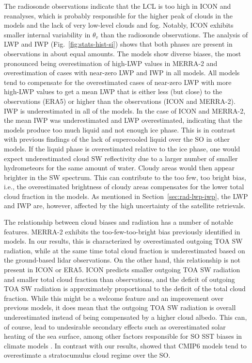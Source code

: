 \documentclass[draft]{agujournal2019}
\begin{document}
The radiosonde observations indicate that the LCL is too high in ICON and reanalyses, which is probably responsible for the higher peak of clouds in the models and the lack of very low-level clouds and fog. Notably, ICON exhibits smaller internal variability in $\theta_v$ than the radiosonde observations. The analysis of LWP and IWP (Fig.~\ref{fig:stats-hist-si}) shows that both phases are present in observations in about equal amounts. The models show diverse biases, the most pronounced being overestimation of high-LWP values in MERRA-2 and overestimation of cases with near-zero LWP and IWP in all models. All models tend to compensate for the overestimated cases of near-zero LWP with more high-LWP values to get a mean LWP that is either less (but close) to the observations (ERA5) or higher than the observations (ICON and MERRA-2). IWP is underestimated in all of the models. In the case of ICON and MERRA-2, the mean IWP was underestimated and LWP overestimated, indicating that the models produce too much liquid and not enough ice phase. This is in contrast with previous findings of the lack of supercooled liquid over the SO in other models. If the liquid phase is overestimated relative to the ice phase, one would expect underestimated cloud SW reflectivity due to a larger number of smaller hydrometeors for the same amount of water. Cloudy areas would then appear brighter in the SW spectrum. This can contribute to the too few, too bright bias, i.e., the overestimated brightness of cloudy areas compensates for the lower total cloud fraction in the models. As mentioned in Section~\ref{sec:rad-lwp-iwp}, the LWP and IWP are, however, affected by the high uncertainty of the satellite retrievals.

The relationship between cloud biases and radiation has a number of notable features. MERRA-2 exhibits the too-few-too-bright bias previously identified in models. In our results, this is characterized by overestimated outgoing TOA SW radiation, while at the same time total cloud fraction is underestimated based on the ground-based lidar observations. On the other hand, this relationship is not present in ICON or ERA5. ICON predicts smaller outgoing TOA SW radiation and smaller total cloud fraction than observations, and the deficit of outgoing TOA SW radiation is approximately proportional to the deficit of the total cloud fraction. While this might be a welcome feature and an improvement over previous models, it does mean that the outgoing TOA SW radiation is overall underestimated instead of being compensated by a higher cloud albedo. This can, of course, lead to undesirable secondary effects such as overestimated solar heating of the sea surface, among other factors responsible for SO SST biases in climate models \cite{zhang2023,luo2023,hyder2018}. In contrast with our results,  showed that CMIP6 models tend to overestimate a stratocumulus cloud regime over the SO.
\end{document}
